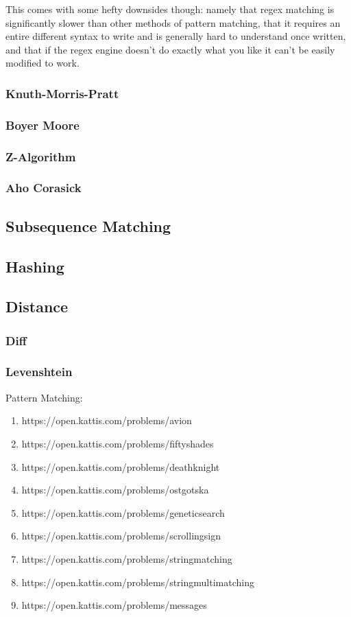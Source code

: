 This comes with some hefty downsides though: namely that regex matching is significantly slower than other methods of pattern matching, that it requires an entire different syntax to write and is generally hard to understand once written, and that if the regex engine doesn't do exactly what you like it can't be easily modified to work.

\subsubsection{Knuth-Morris-Pratt}
\subsubsection{Boyer Moore}
\subsubsection{Z-Algorithm}
\subsubsection{Aho Corasick}
\subsection{Subsequence Matching}
\subsection{Hashing}
\subsection{Distance}
\subsubsection{Diff}
\subsubsection{Levenshtein}

\hrulefill

Pattern Matching:
\begin{enumerate}
\item https://open.kattis.com/problems/avion
\item https://open.kattis.com/problems/fiftyshades
\item https://open.kattis.com/problems/deathknight
\item https://open.kattis.com/problems/ostgotska
\item https://open.kattis.com/problems/geneticsearch
\item https://open.kattis.com/problems/scrollingsign
\item https://open.kattis.com/problems/stringmatching
\item https://open.kattis.com/problems/stringmultimatching
\item https://open.kattis.com/problems/messages
\end{enumerate}